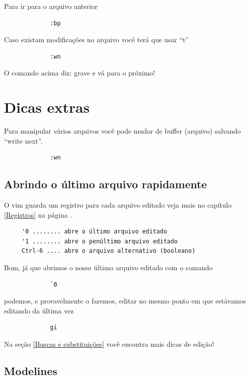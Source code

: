 \documentclass[10pt,a4paper,openany]{book}
\begin{document}
Para ir para o arquivo anterior

\begin{verbatim}
			 :bp
\end{verbatim}

Caso existam modificações no arquivo você terá que usar ``t''

\begin{verbatim}
			 :wn
\end{verbatim}

O comando acima diz: grave e vá para o próximo!

\section{Dicas extras}
\label{Dicas extras}

Para manipular vários arquivos você pode mudar de buffer (arquivo)
salvando ``write next''.

\begin{verbatim}
			 :wn
\end{verbatim}



\subsection{Abrindo o último arquivo rapidamente}
O vim guarda um registro para cada arquivo editado veja
mais no capítulo \ref{Registros} na página \pageref{Registros}.

\begin{verbatim}
	 '0 ........ abre o último arquivo editado
	 '1 ........ abre o penúltimo arquivo editado
	 Ctrl-6 .... abre o arquivo alternativo (booleano)
\end{verbatim}

Bom, já que abrimos o nosso último arquivo editado com o comando

\begin{verbatim}
			 `0
\end{verbatim}

podemos, e provavelmente o faremos, editar no mesmo ponto em que estávamos
editando da última vez

\begin{verbatim}
			 gi
\end{verbatim}

Na seção \ref{Buscas e substituições} você encontra mais dicas de edição!


\subsection{Modelines}\label{sec:Modelines}
\end{document}
